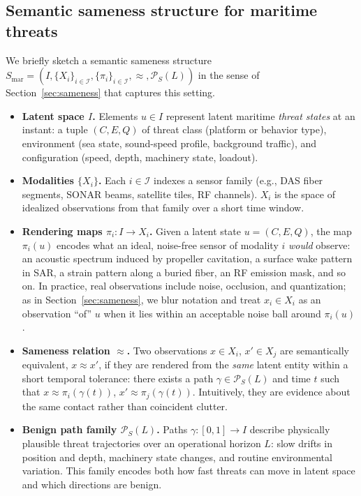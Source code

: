 \documentclass[11pt]{article}
\begin{document}
\subsection{Semantic sameness structure for maritime threats}

We briefly sketch a semantic sameness structure
$S_{\mathrm{mar}} = (I, \{X_i\}_{i\in\mathcal{I}}, \{\pi_i\}_{i\in\mathcal{I}},
\approx, \mathcal{P}_S(L))$ in the sense of Section~\ref{sec:sameness} that
captures this setting.

\begin{itemize}
  \item \textbf{Latent space $I$.} Elements $u \in I$ represent latent maritime
  \emph{threat states} at an instant: a tuple $(C,E,Q)$ of threat class
  (platform or behavior type), environment (sea state, sound-speed profile,
  background traffic), and configuration (speed, depth, machinery state, loadout).

  \item \textbf{Modalities $\{X_i\}$.} Each $i\in\mathcal{I}$ indexes a sensor
  family (e.g., DAS fiber segments, SONAR beams, satellite tiles, RF channels).
  $X_i$ is the space of idealized observations from that family over a short
  time window.

  \item \textbf{Rendering maps $\pi_i : I \to X_i$.} Given a latent state
  $u = (C,E,Q)$, the map $\pi_i(u)$ encodes what an ideal, noise-free sensor
  of modality $i$ \emph{would} observe: an acoustic spectrum induced by
  propeller cavitation, a surface wake pattern in SAR, a strain pattern along
  a buried fiber, an RF emission mask, and so on. In practice, real observations
  include noise, occlusion, and quantization; as in Section~\ref{sec:sameness},
  we blur notation and treat $x_i\in X_i$ as an observation ``of'' $u$ when it
  lies within an acceptable noise ball around $\pi_i(u)$.

  \item \textbf{Sameness relation $\approx$.} Two observations $x\in X_i$,
  $x'\in X_j$ are semantically equivalent, $x\approx x'$, if they are rendered
  from the \emph{same} latent entity within a short temporal tolerance: there
  exists a path $\gamma\in\mathcal{P}_S(L)$ and time $t$ such that
  $x\approx \pi_i(\gamma(t))$, $x'\approx \pi_j(\gamma(t))$.
  Intuitively, they are evidence about the same contact rather than coincident
  clutter.

  \item \textbf{Benign path family $\mathcal{P}_S(L)$.} Paths
  $\gamma : [0,1]\to I$ describe physically plausible threat trajectories over
  an operational horizon $L$: slow drifts in position and depth, machinery
  state changes, and routine environmental variation. This family encodes both
  how fast threats can move in latent space and which directions are benign.
\end{itemize}
\end{document}
